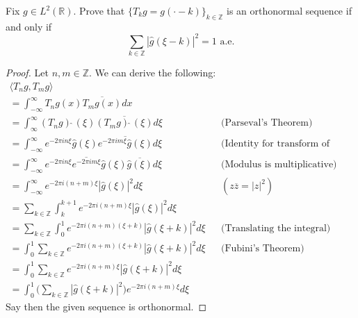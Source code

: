 \documentclass[12pt]{article}
\newenvironment{ex}[2][Exercise]{\begin{trivlist}
\item[\hskip \labelsep {\bfseries #1}\hskip \labelsep {\bfseries #2.}]}{\end{trivlist}}
\begin{document}
\begin{ex}{12}
    Fix $g \in L^2(\mathbb{R})$. Prove that $\{T_kg = g(\cdot - k)\}_{k \in \mathbb{Z}}$ is an orthonormal sequence if and only if 
    $$\sum_{k \in \mathbb{Z}} |\hat{g}(\xi - k)|^2 = 1 \text{ a.e.}$$
    \begin{proof}
        Let $n, m \in \mathbb{Z}$. We can derive the following:
        \begin{align*}
            \langle T_ng, T_mg \rangle \\
            = \int_{-\infty}^\infty T_ng(x)\overline{T_mg(x)}dx \\
            = \int_{\infty}^\infty (T_ng)\hat{\;}(\xi)\overline{(T_mg)\hat{\;}(\xi)} d\xi && \text{(Parseval's Theorem)} \\
            = \int_{-\infty}^\infty e^{-2\pi in\xi}\hat{g}(\xi)\overline{e^{-2\pi im\xi}\hat{g}(\xi)} d\xi && \text{(Identity for transform of translation)} \\
            = \int_{-\infty}^\infty e^{-2\pi in\xi}\overline{e^{-2\pi im\xi}}\hat{g}(\xi)\overline{\hat{g}(\xi)} d\xi && \text{(Modulus is multiplicative)} \\
            = \int_{-\infty}^\infty e^{-2\pi i(n + m)\xi}|\hat{g}(\xi)|^2 d\xi && (z\overline{z} = |z|^2) \\
            = \sum_{k \in \mathbb{Z}} \int_{k}^{k + 1} e^{-2\pi i(n + m)\xi}|\hat{g}(\xi)|^2 d\xi \\
            = \sum_{k \in \mathbb{Z}} \int_0^1 e^{{-2\pi i}(n + m)(\xi + k)}|\hat{g}(\xi + k)|^2 d\xi && \text{(Translating the integral)}\\
            = \int_0^1 \sum_{k \in \mathbb{Z}} e^{{-2\pi i}(n + m)(\xi + k)}|\hat{g}(\xi + k)|^2 d\xi && \text{(Fubini's Theorem)} \\
            = \int_0^1 \sum_{k \in \mathbb{Z}} e^{-2\pi i(n + m)\xi}|\hat{g}(\xi + k)|^2 d\xi \\
            = \int_0^1 \Big ( \sum_{k \in \mathbb{Z}} |\hat{g}(\xi + k)|^2 \Big)e^{-2\pi i(n + m)\xi} d\xi
        \end{align*}
        Say then the given sequence is orthonormal.
    \end{proof}
\end{ex}
\end{document}

